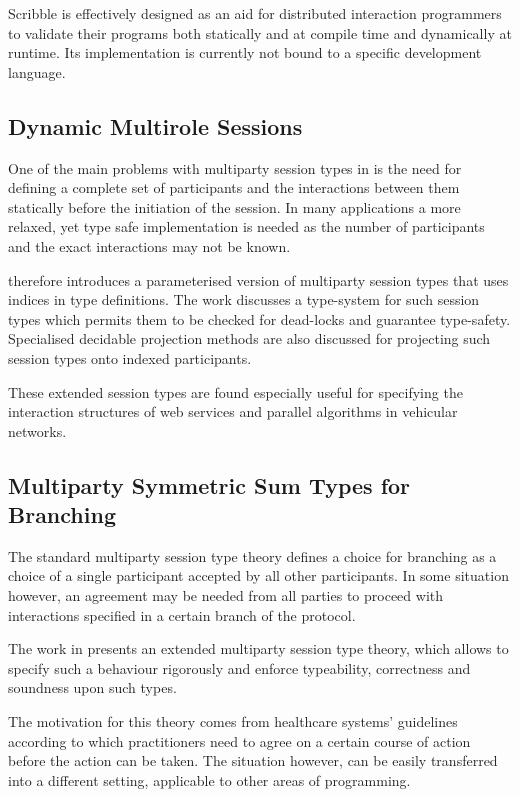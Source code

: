 Scribble is effectively designed as an aid for distributed interaction programmers to validate their programs both statically and at compile time and dynamically at runtime. Its implementation is currently not bound to a specific development language.

\subsection*{Dynamic Multirole Sessions}

One of the main problems with multiparty session types in \cite{multiparty_sess_types} is the need for defining a complete set of participants and the interactions between them statically before the initiation of the session. In many applications a more relaxed, yet type safe implementation is needed as the number of participants and the exact interactions may not be known.

\cite{param_mpst} therefore introduces a parameterised version of multiparty session types that uses indices in type definitions. The work discusses a type-system for such session types which permits them to be checked for dead-locks and guarantee type-safety. Specialised decidable projection methods are also discussed for projecting such session types onto indexed participants.

These extended session types are found especially useful for specifying the interaction structures of web services and parallel algorithms in vehicular networks. 


\subsection*{Multiparty Symmetric Sum Types for Branching}

The standard multiparty session type theory defines a choice for branching as a choice of a single participant accepted by all other participants. In some situation however, an agreement may be needed from all parties to proceed with interactions specified in a certain branch of the protocol.

The work in \cite{symmetric_sum} presents an extended multiparty session type theory, which allows to specify such a behaviour rigorously and enforce typeability, correctness and soundness upon such types.

The motivation for this theory comes from healthcare systems' guidelines according to which practitioners need to agree on a certain course of action before the action can be taken. The situation however, can be easily transferred into a different setting, applicable to other areas of programming.

